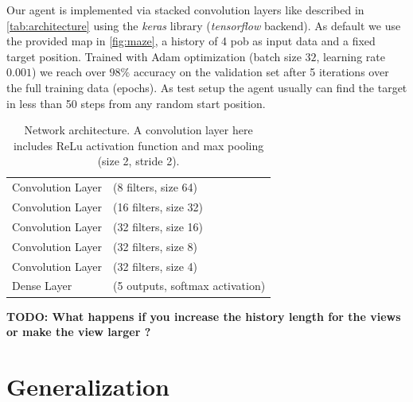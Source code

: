\documentclass[a4paper,14pt]{article}
\begin{document}
Our agent is implemented via stacked convolution layers like described in
\autoref{tab:architecture} using the \emph{keras} library (\emph{tensorflow} backend).
As default we use the provided map in \autoref{fig:maze}, a history of 4 pob as input data
and a fixed target position.
Trained with Adam optimization (batch size $32$, learning rate $0.001$) we reach over $98\%$
accuracy on the validation set after 5 iterations over the full training data
(epochs).
As test setup the agent usually can find the target in less than 50 steps from
any random start position.

\begin{table}[h]
  \centering
  \begin{tabular}{ll}
    \hline
    Convolution Layer & (8 filters, size 64) \\
    Convolution Layer & (16 filters, size 32) \\
    Convolution Layer & (32 filters, size 16) \\
    Convolution Layer & (32 filters, size 8) \\
    Convolution Layer & (32 filters, size 4) \\
    Dense Layer & (5 outputs, softmax activation) \\
    \hline
  \end{tabular}
  \caption{Network architecture. A convolution layer here includes ReLu
    activation function and max pooling (size 2, stride 2).}
  \label{tab:architecture}
\end{table}

\textbf{TODO: What happens if you increase the history length for the views or make the
view larger ?}

\section{Generalization}\label{sec:generalization}
\end{document}
